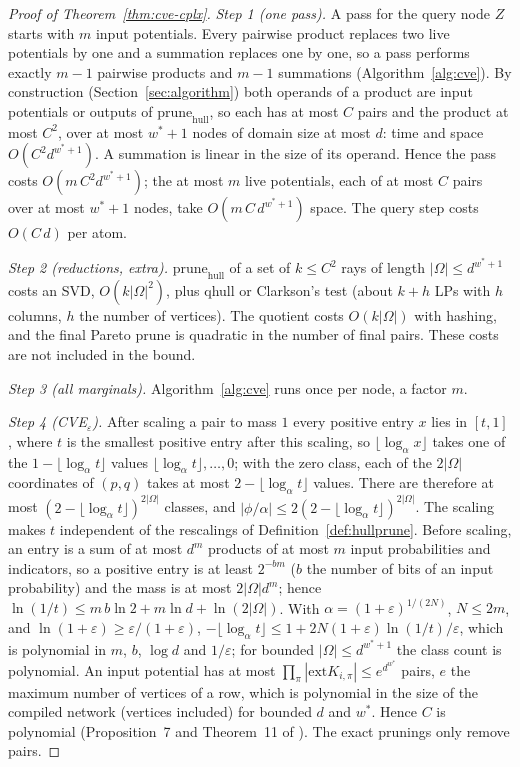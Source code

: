 \documentclass{article} %
\newcommand{\ext}{\mathrm{ext}}
\newcommand{\prune}{\mathrm{prune}}
\begin{document}
\begin{proof}[Proof of Theorem~\ref{thm:cve-cplx}]
\emph{Step 1 (one pass).} A pass for the query node $Z$ starts with $m$ input
potentials. Every pairwise product replaces two live potentials by one and a summation
replaces one by one, so a pass performs exactly $m-1$ pairwise products and $m-1$
summations (Algorithm~\ref{alg:cve}). By construction (Section~\ref{sec:algorithm}) both
operands of a product are input potentials or outputs of $\prune_{\mathrm{hull}}$, so each
has at most $C$ pairs and the product at most $C^2$, over at most $w^*+1$ nodes of domain
size at most $d$: time and space $O(C^2d^{w^*+1})$. A summation is linear in the size of
its operand. Hence the pass costs $O(m\,C^2d^{w^*+1})$; the at most $m$ live potentials,
each of at most $C$ pairs over at most $w^*+1$ nodes, take $O(m\,C\,d^{w^*+1})$ space. The
query step costs $O(C\,d)$ per atom.

\emph{Step 2 (reductions, extra).} $\prune_{\mathrm{hull}}$ of a set of $k\le C^2$ rays
of length $|\Omega|\le d^{w^*+1}$ costs an SVD, $O(k|\Omega|^2)$, plus qhull or Clarkson's
test (about $k+h$ LPs with $h$ columns, $h$ the number of vertices). The quotient costs
$O(k|\Omega|)$ with hashing, and the final Pareto prune is quadratic in the number of final
pairs. These costs are not included in the bound.

\emph{Step 3 (all marginals).} Algorithm~\ref{alg:cve} runs once per node, a factor $m$.

\emph{Step 4 (CVE$_\varepsilon$).} After scaling a pair to mass $1$ every positive entry
$x$ lies in $[t,1]$, where $t$ is the smallest positive entry after this scaling, so
$\lfloor\log_\alpha x\rfloor$ takes one of the $1-\lfloor\log_\alpha t\rfloor$ values
$\lfloor\log_\alpha t\rfloor,\dots,0$; with the zero class, each of the $2|\Omega|$
coordinates of $(p,q)$ takes at most $2-\lfloor\log_\alpha t\rfloor$ values. There are
therefore at most $(2-\lfloor\log_\alpha t\rfloor)^{2|\Omega|}$ classes, and
$|\phi/\alpha|\le2(2-\lfloor\log_\alpha t\rfloor)^{2|\Omega|}$. The scaling makes $t$
independent of the rescalings of Definition~\ref{def:hullprune}. Before scaling, an entry
is a sum of at most $d^m$ products of at most $m$ input probabilities and indicators, so a
positive entry is at least $2^{-bm}$ ($b$ the number of bits of an input probability) and
the mass is at most $2|\Omega|d^m$; hence $\ln(1/t)\le m\,b\ln2+m\ln d+\ln(2|\Omega|)$. With
$\alpha=(1+\varepsilon)^{1/(2N)}$, $N\le2m$, and $\ln(1+\varepsilon)\ge\varepsilon/(1+\varepsilon)$,
$-\lfloor\log_\alpha t\rfloor\le1+2N(1+\varepsilon)\ln(1/t)/\varepsilon$, which is polynomial
in $m$, $b$, $\log d$ and $1/\varepsilon$; for bounded $|\Omega|\le d^{w^*+1}$ the class count
is polynomial. An input potential has at most $\prod_\pi|\ext K_{i,\pi}|\le e^{d^{w^*}}$
pairs, $e$ the maximum number of vertices of a row, which is polynomial in the size of the
compiled network (vertices included) for bounded $d$ and $w^*$. Hence $C$ is polynomial
(Proposition~7 and Theorem~11 of \citealt{maua2012ijar}). The exact prunings only remove
pairs.
\end{proof}
\end{document}
